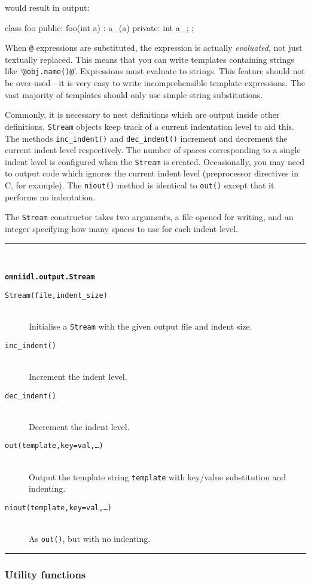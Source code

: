 \documentclass[11pt,twoside,a4paper]{article}
\newcommand{\func}[1]{\texttt{#1}}
\newcommand{\var}[1]{\texttt{#1}}
\newcommand{\class}[1]{\texttt{#1}}
\newcommand{\dfunc}[1]{\item[\func{#1}]\mbox{}\\}
\newenvironment{funcdesc}[1]%
  {\vspace{\baselineskip}%
   \noindent\begin{minipage}{\textwidth}%
   \noindent\rule{\textwidth}{1.5pt}\\%
   \centerline{\textbf{\texttt{#1}}}%
   \vspace{-.5\baselineskip}%
   \begin{description}}
  {\vspace{-\baselineskip}\end{description}%
   \noindent\rule{\textwidth}{1.5pt}\end{minipage}}
\begin{document}
\noindent would result in output:

\begin{cxxlisting}
  class foo {
  public:
    foo(int a) : a_(a) {}
  private:
    int a_;
  };
\end{cxxlisting}


When \texttt{@} expressions are substituted, the expression is
actually \emph{evaluated}, not just textually replaced. This means
that you can write templates containing strings like
`\texttt{@obj.name()@}'. Expressions must evaluate to strings. This
feature should not be over-used---it is very easy to write
incomprehensible template expressions. The vast majority of templates
should only use simple string substitutions.

Commonly, it is necessary to nest definitions which are output inside
other definitions. \class{Stream} objects keep track of a current
indentation level to aid this. The methods \func{inc\_indent()} and
\func{dec\_indent()} increment and decrement the current indent level
respectively. The number of spaces corresponding to a single indent
level is configured when the \class{Stream} is created. Occasionally,
you may need to output code which ignores the current indent level
(preprocessor directives in C, for example). The \func{niout()} method
is identical to \func{out()} except that it performs no indentation.

The \class{Stream} constructor takes two arguments, a file opened for
writing, and an integer specifying how many spaces to use for each
indent level.


\begin{funcdesc}{omniidl.output.Stream}

\dfunc{Stream(file,indent\_size)}
  Initialise a \class{Stream} with the given output file and indent
  size.

\dfunc{inc\_indent()}
  Increment the indent level.

\dfunc{dec\_indent()}
  Decrement the indent level.

\dfunc{out(template,key=val,\dots)}
  Output the template string \var{template} with key/value
  substitution and indenting.

\dfunc{niout(template,key=val,\dots)}
  As \func{out()}, but with no indenting.

\end{funcdesc}


\subsubsection{Utility functions}
\end{document}
